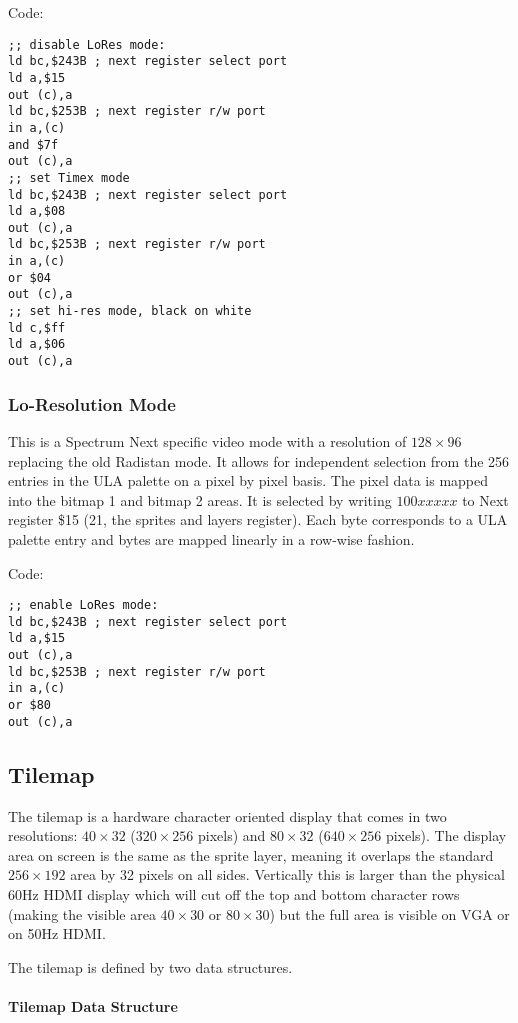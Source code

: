 Code:
\begin{verbatim}
;; disable LoRes mode:
ld bc,$243B ; next register select port
ld a,$15
out (c),a
ld bc,$253B ; next register r/w port
in a,(c)
and $7f
out (c),a
;; set Timex mode
ld bc,$243B ; next register select port
ld a,$08
out (c),a
ld bc,$253B ; next register r/w port
in a,(c)
or $04
out (c),a
;; set hi-res mode, black on white
ld c,$ff
ld a,$06
out (c),a
\end{verbatim}

\subsubsection{Lo-Resolution Mode}

This is a Spectrum Next specific video mode with a resolution of
$128\times96$ replacing the old Radistan mode.  It allows for
independent selection from the 256 entries in the ULA palette on a
pixel by pixel basis. The pixel data is mapped into the bitmap 1 and
bitmap 2 areas.  It is selected by writing $100xxxxx$ to Next register
\$15 (21, the sprites and layers register).  Each byte corresponds to
a ULA palette entry and bytes are mapped linearly in a row-wise
fashion.

Code:
\begin{verbatim}
;; enable LoRes mode:
ld bc,$243B ; next register select port
ld a,$15
out (c),a
ld bc,$253B ; next register r/w port
in a,(c)
or $80
out (c),a
\end{verbatim}

\subsection{Tilemap}

The tilemap is a hardware character oriented display that comes in two
resolutions: $40\times32$ ($320\times256$ pixels) and $80\times32$
($640\times256$ pixels).  The display area on screen is the same as
the sprite layer, meaning it overlaps the standard $256\times192$ area
by 32 pixels on all sides.  Vertically this is larger than the
physical 60Hz HDMI display which will cut off the top and bottom
character rows (making the visible area $40\times30$ or $80\times30$)
but the full area is visible on VGA or on 50Hz HDMI.

The tilemap is defined by two data structures.

\paragraph{Tilemap Data Structure}

